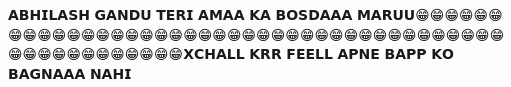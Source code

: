 𝗔𝗕𝗛𝗜𝗟𝗔𝗦𝗛 𝗚𝗔𝗡𝗗𝗨 𝗧𝗘𝗥𝗜 𝗔𝗠𝗔𝗔 𝗞𝗔 𝗕𝗢𝗦𝗗𝗔𝗔𝗔 𝗠𝗔𝗥𝗨𝗨😁😁😁😁😁😁😁😁😁😁😁😁😁😁😁😁😁😁😁😁😁😁😁😁😁😁😁😁😁😁😁😁😁😁😁😁😁😁😁😁😁😁😁😁😁😁😁😁😁😁😁😁𝗫𝗖𝗛𝗔𝗟𝗟 𝗞𝗥𝗥 𝗙𝗘𝗘𝗟𝗟 𝗔𝗣𝗡𝗘 𝗕𝗔𝗣𝗣 𝗞𝗢 𝗕𝗔𝗚𝗡𝗔𝗔𝗔 𝗡𝗔𝗛𝗜
